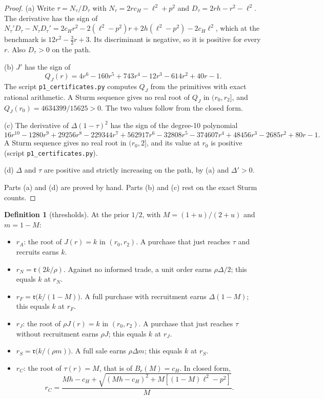 \documentclass[11pt]{article}
\theoremstyle{definition}
\newtheorem{definition}{Definition}
\newcommand{\fr}{\mathfrak r}
\begin{document}
\begin{proof}
(a) Write $\tau=N_\tau/D_\tau$ with $N_\tau=2rc_H-\ell^2+p^2$ and $D_\tau=2rh-r^2-\ell^2$. The derivative has the
sign of $N_\tau'D_\tau-N_\tau D_\tau'=2c_Hr^2-2(\ell^2-p^2)r+2h(\ell^2-p^2)-2c_H\ell^2$, which at the benchmark is
$12r^2-\tfrac32r+3$. Its discriminant is negative, so it is positive for every $r$. Also $D_\tau>0$ on the path.

(b) $J'$ has the sign of
\[
Q_J(r)=4r^6-160r^5+743r^4-12r^3-614r^2+40r-1 .
\]
The script \texttt{p1\_certificates.py} computes $Q_J$ from the primitives with exact rational arithmetic. A Sturm
sequence gives no real root of $Q_J$ in $(r_0,r_2]$, and $Q_J(r_0)=4634399/15625>0$. The two values follow
from the closed form.

(c) The derivative of $\Delta(1-\tau)^2$ has the sign of the degree-10 polynomial
\[
16r^{10}-1280r^9+29256r^8-229344r^7+562917r^6-32808r^5-374607r^4+48456r^3-2685r^2+80r-1 .
\]
A Sturm sequence gives no real root in $(r_0,2]$, and its value at $r_0$ is positive (script
\texttt{p1\_certificates.py}).

(d) $\Delta$ and $\tau$ are positive and strictly increasing on the path, by (a) and $\Delta'>0$.

Parts (a) and (d) are proved by hand. Parts (b) and (c) rest on the exact Sturm counts.
\end{proof}

\begin{definition}[thresholds]\label{def:thresholds}
At the prior $1/2$, with $M=(1+u)/(2+u)$ and $m=1-M$:
\begin{itemize}
\item $r_A$: the root of $J(r)=k$ in $(r_0,r_2)$. A purchase that just reaches $\tau$ and recruits earns $k$.
\item $r_N=\fr(2k/\rho)$. Against no informed trade, a unit order earns $\rho\Delta/2$; this equals $k$ at $r_N$.
\item $r_F=\fr\big(k/(1-M)\big)$. A full purchase with recruitment earns $\Delta(1-M)$; this equals $k$ at $r_F$.
\item $r_J$: the root of $\rho J(r)=k$ in $(r_0,r_2)$. A purchase that just reaches $\tau$ without recruitment
  earns $\rho J$; this equals $k$ at $r_J$.
\item $r_S=\fr\big(k/(\rho m)\big)$. A full sale earns $\rho\Delta m$; this equals $k$ at $r_S$.
\item $r_C$: the root of $\tau(r)=M$, that is of $B_r(M)=c_H$. In closed form,
  \[
  r_C=\frac{Mh-c_H+\sqrt{(Mh-c_H)^2+M[(1-M)\ell^2-p^2]}}{M}.
  \]
\end{itemize}
\end{definition}
\end{document}
